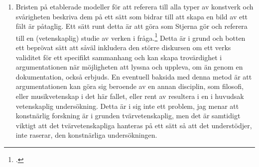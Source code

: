 \documentclass[11pt]{article}
\begin{document}
\begin{enumerate}
  \item Bristen på etablerade modeller för att referera till alla
    typer av konstverk och svårigheten beskriva dem på ett sätt som
    bidrar till att skapa en bild av ett fält är påtaglig. Ett sätt
    runt detta är att göra som Stjerna gör och referera till en
    (vetenskaplig) studie av verken i fråga.\footcite[Se
    t.ex. referenser till Cox och LaBelle: ][s.45]{Stjerna2018} Detta
    är i grund och botten ett beprövat sätt att såväl inkludera den
    större diskursen om ett verks validitet för ett specifikt
    sammanhang och kan skapa trovärdighet i argumentationen när
    möjligheten att lyssna och uppleva, om än genom en dokumentation,
    också erbjuds. En eventuell baksida med denna metod är att
    argumentationen kan göra sig beroende av en annan disciplin, som
    filosofi, eller musikvetenskap i det här fallet, eller rent av
    resultera i en i huvudsak vetenskaplig undersökning. Detta är i
    sig inte ett problem, jag menar att konstnärlig forskning är i
    grunden tvärvetenskaplig, men det är samtidigt viktigt att det
    tvärvetenskapliga hanteras på ett sätt så att det understödjer, inte
    raserar, den konstnärliga undersökningen.


\end{enumerate}
\end{document}
